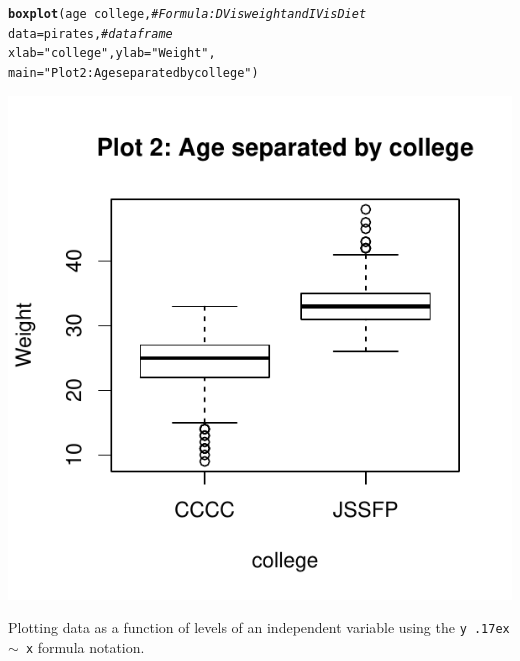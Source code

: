 \documentclass{tufte-book}\usepackage[]{graphicx}\usepackage[]{color}
\makeatletter
\def\maxwidth{ %
  \ifdim\Gin@nat@width>\linewidth
    \linewidth
  \else
    \Gin@nat@width
  \fi
}
\newcommand{\hlstr}[1]{\textcolor[rgb]{0.192,0.494,0.8}{#1}}%
\newcommand{\hlcom}[1]{\textcolor[rgb]{0.678,0.584,0.686}{\textit{#1}}}%
\newcommand{\hlopt}[1]{\textcolor[rgb]{0,0,0}{#1}}%
\newcommand{\hlstd}[1]{\textcolor[rgb]{0.345,0.345,0.345}{#1}}%
\newcommand{\hlkwc}[1]{\textcolor[rgb]{0.333,0.667,0.333}{#1}}%
\newcommand{\hlkwd}[1]{\textcolor[rgb]{0.737,0.353,0.396}{\textbf{#1}}}%
\newenvironment{kframe}{%
 \def\at@end@of@kframe{}%
 \ifinner\ifhmode%
  \def\at@end@of@kframe{\end{minipage}}%
  \begin{minipage}{\columnwidth}%
 \fi\fi%
 \def\FrameCommand##1{\hskip\@totalleftmargin \hskip-\fboxsep
 \colorbox{shadecolor}{##1}\hskip-\fboxsep
     \hskip-\linewidth \hskip-\@totalleftmargin \hskip\columnwidth}%
 \MakeFramed {\advance\hsize-\width
   \@totalleftmargin\z@ \linewidth\hsize
   \@setminipage}}%
 {\par\unskip\endMakeFramed%
 \at@end@of@kframe}
\newenvironment{knitrout}{}{} %
\makeatother
\begin{document}
\begin{footnotesize}
\begin{marginfigure}
\begin{tiny}
\begin{knitrout}
\color{fgcolor}\begin{kframe}
\begin{alltt}
\hlkwd{boxplot}\hlstd{(age} \hlopt{~} \hlstd{college,} \hlcom{# Formula: DV is weight and IV is Diet}
        \hlkwc{data} \hlstd{= pirates,} \hlcom{# dataframe}
        \hlkwc{xlab} \hlstd{=} \hlstr{"college"}\hlstd{,} \hlkwc{ylab} \hlstd{=} \hlstr{"Weight"}\hlstd{,}
        \hlkwc{main} \hlstd{=} \hlstr{"Plot 2: Age separated by college"}\hlstd{)}
\end{alltt}
\end{kframe}
\includegraphics[width=\maxwidth]{figure/unnamed-chunk-150-1} 

\end{knitrout}
\end{tiny}
\caption{Plotting data as a function of levels of an independent variable using the \texttt{y {\raise.17ex\hbox{$\scriptstyle\sim$}} x} formula notation.}
\label{fig:boxplot2}
\end{marginfigure}



\vspace{5mm} %
\noindent
\setlength{\fboxrule}{1.5pt}
\fbox{
\parbox{\textwidth}{

}}
\end{footnotesize}
\end{document}
